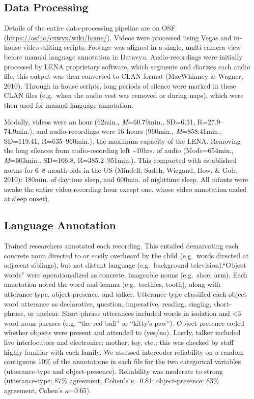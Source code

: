 \documentclass[man]{apa6}
\theoremstyle{definition}
\theoremstyle{definition}
\theoremstyle{definition}
\theoremstyle{remark}
\begin{document}
\subsection{Data Processing}\label{data-processing}

Details of the entire data-processing pipeline are on OSF
(\url{https://osf.io/cxwyz/wiki/home/}). Videos were processed using
Vegas and in-house video-editing scripts. Footage was aligned in a
single, multi-camera view before manual language annotation in Datavyu.
Audio-recordings were initially processed by LENA proprietary software,
which segments and diarizes each audio file; this output was then
converted to CLAN format (MacWhinney \& Wagner, 2010). Through in-house
scripts, long periods of silence were marked in these CLAN files
(e.g.~when the audio vest was removed or during naps), which were then
used for manual language annotation.

Modally, videos were an hour (62min., \emph{M}=60.79min., SD=6.31,
R=27.9--74.9min.), and audio-recordings were 16 hours (960min.,
\emph{M}=858.41min., SD=119.41, R=635--960min.), the maximum capacity of
the LENA. Removing the long silences from audio-recording left
\textasciitilde{}10hrs. of audio (Mode=654min., \emph{M}=603min.,
SD=106.8, R=385.2--951min.). This comported with established norms for
6--8-month-olds in the US (Mindell, Sadeh, Wiegand, How, \& Goh, 2010):
180min. of daytime sleep, and 600min. of nighttime sleep. All infants
were awake the entire video-recording hour except one, whose video
annotation ended at sleep onset).

\subsection{Language Annotation}\label{language-annotation}

Trained researchers annotated each recording. This entailed demarcating
each concrete noun directed to or easily overheard by the child
(e.g.~words directed at adjacent siblings), but not distant language
(e.g.~background television).\enquote{Object words} were operationalized
as concrete, imageable nouns (e.g.~shoe, arm). Each annotation noted the
word and lemma (e.g.~teethies, tooth), along with utterance-type, object
presence, and talker. Utterance-type classified each object word
utterance as declarative, question, imperative, reading, singing,
short-phrase, or unclear. Short-phrase utterances included words in
isolation and \textless{}3 word noun-phrases (e.g. \enquote{the red
ball} or \enquote{kitty's paw}). Object-presence coded whether objects
were present and attended to (yes/no). Lastly, talker included live
interlocutors and electronics: mother, toy, etc.; this was checked by
staff highly familiar with each family. We assessed intercoder
reliability on a random contiguous 10\% of the annotations in each file
for the two categorical variables (utterance-type and object-presence).
Reliability was moderate to strong (utterance-type: 87\% agreement,
Cohen's \(\kappa\)=0.81; object-presence: 83\% agreement, Cohen's
\(\kappa\)=0.65).
\end{document}
